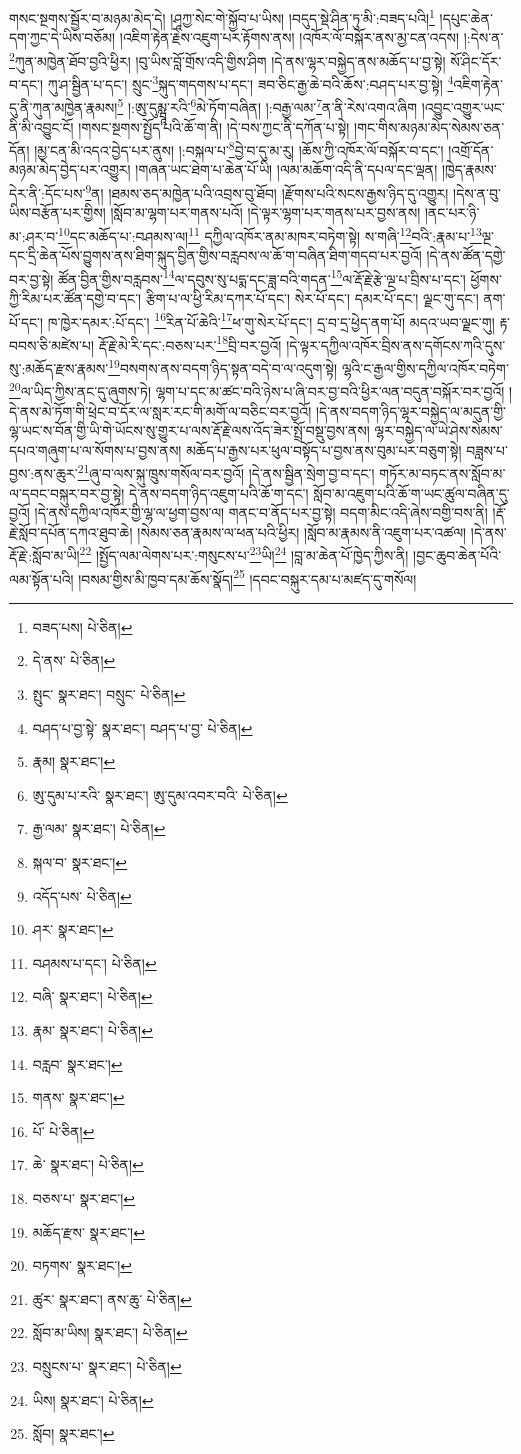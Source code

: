 གསང་སྔགས་སྦྱོར་བ་མཉམ་མེད་དེ། །ཤཱཀྱ་སེང་གེ་སྐྱོབ་པ་ཡིས། །བདུད་སྡེ་ཤིན་ཏུ་མི་:བཟད་པའི།\footnote{བཟད་པས།  པེ་ཅིན། } །དཔུང་ཆེན་དག་ཀྱང་དེ་ཡིས་བཅོམ། །འཇིག་རྟེན་རྗེས་འཇུག་པར་རྟོགས་ནས། །འཁོར་ལོ་བསྐོར་ནས་མྱ་ངན་འདས། །:དེས་ན་\footnote{དེ་ནས་  པེ་ཅིན། }ཀུན་མཁྱེན་ཐོབ་བྱའི་ཕྱིར། །བུ་ཡིས་བློ་གྲོས་འདི་གྱིས་ཤིག །དེ་ནས་ལྷར་བསྐྱེད་ནས་མཆོད་པ་བྱ་སྟེ། སོ་ཤིང་དོར་བ་དང་། ཀུ་ཤ་སྦྱིན་པ་དང་། སྲུང་\footnote{སྤུང་  སྣར་ཐང་། བསྲུང་  པེ་ཅིན། }སྐུད་གདགས་པ་དང་། ཟབ་ཅིང་རྒྱ་ཆེ་བའི་ཆོས་:བཤད་པར་བྱ་སྟེ། \footnote{བཤད་པ་བྱ་སྟེ་  སྣར་ཐང་། བཤད་པ་བྱ་  པེ་ཅིན། }འཇིག་རྟེན་དུ་ནི་ཀུན་མཁྱེན་རྣམས།\footnote{རྣམ།  སྣར་ཐང་། } །:ཨུ་དུམྺཱ་རའི་\footnote{ཨུ་དུམ་པ་རའི་  སྣར་ཐང་། ཨུ་དུམ་འབར་བའི་  པེ་ཅིན། }མེ་ཏོག་བཞིན། །:བརྒྱ་ལམ་\footnote{རྒྱ་ལམ་  སྣར་ཐང་།  པེ་ཅིན། }ན་ནི་རེས་འགའ་ཞིག །འབྱུང་འགྱུར་ཡང་ནི་མི་འབྱུང་ངོ། །གསང་སྔགས་སྤྱོད་པའི་ཆོ་ག་ནི། །དེ་བས་ཀྱང་ནི་དཀོན་པ་སྟེ། །གང་གིས་མཉམ་མེད་སེམས་ཅན་དོན། །མྱ་ངན་མི་འདའ་བྱེད་པར་ནུས། །:བསྐལ་པ་\footnote{སྐལ་བ་  སྣར་ཐང་། }བྱེ་བ་དུ་མ་རུ། །ཆོས་ཀྱི་འཁོར་ལོ་བསྐོར་བ་དང་། །འགྲོ་དོན་མཉམ་མེད་བྱེད་པར་འགྱུར། །གཞན་ཡང་ཐེག་པ་ཆེན་པོ་ཡི། །ལམ་མཆོག་འདི་ནི་དཔལ་དང་ལྡན། །ཁྱེད་རྣམས་དེར་ནི་:དོང་པས་\footnote{འདོད་པས་  པེ་ཅིན། }ན། །ཐམས་ཅད་མཁྱེན་པའི་འབྲས་བུ་ཐོབ། །རྫོགས་པའི་སངས་རྒྱས་ཉིད་དུ་འགྱུར། །དེས་ན་བུ་ཡིས་བརྩོན་པར་གྱིས། །སློབ་མ་ལྷག་པར་གནས་པའོ། །དེ་ལྟར་ལྷག་པར་གནས་པར་བྱས་ནས། །ནང་པར་ཉི་མ་:ཤར་བ་\footnote{ཤར་  སྣར་ཐང་། }དང་མཆོད་པ་:བཤམས་ལ།\footnote{བཤམས་པ་དང་།  པེ་ཅིན། } དཀྱིལ་འཁོར་ནམ་མཁར་བཏེག་སྟེ། ས་གཞི་\footnote{བཞི་  སྣར་ཐང་།  པེ་ཅིན། }བའི་:རྣམ་པ་\footnote{རྣམ་  སྣར་ཐང་།  པེ་ཅིན། }ལྔ་དང་དྲི་ཆེན་པོས་བྱུགས་ནས་ཐིག་སྐུད་བྱིན་གྱིས་བརླབས་ལ་ཆོ་ག་བཞིན་ཐིག་གདབ་པར་བྱའོ། །དེ་ནས་ཚོན་དགྱེ་བར་བྱ་སྟེ། ཚོན་བྱིན་གྱིས་བརླབས་\footnote{བརླབ་  སྣར་ཐང་། }ལ་དབུས་སུ་པདྨ་དང་ཟླ་བའི་གདན་\footnote{གནས་  སྣར་ཐང་། }ལ་རྡོ་རྗེ་རྩེ་ལྔ་པ་བྲིས་པ་དང་། ཕྱོགས་ཀྱི་རིམ་པར་ཚོན་དགྱེ་བ་དང་། རྩིག་པ་ལ་ཕྱི་རིམ་དཀར་པོ་དང་། སེར་པོ་དང་། དམར་པོ་དང་། ལྗང་གུ་དང་། ནག་པོ་དང་། ཁ་ཁྱེར་དམར་:པོ་དང་། \footnote{པོ་  པེ་ཅིན། }རིན་པོ་ཆེའི་\footnote{ཆེ་  སྣར་ཐང་།  པེ་ཅིན། }ཕ་གུ་སེར་པོ་དང་། དྲ་བ་དྲ་ཕྱེད་ནག་པོ། མདའ་ཡབ་ལྗང་གུ། རྟ་བབས་ཅི་མཛེས་པ། རྡོ་རྗེ་མེ་རི་དང་:བཅས་པར་\footnote{བཅས་པ་  སྣར་ཐང་། }བྲི་བར་བྱའོ། །དེ་ལྟར་དཀྱིལ་འཁོར་བྲིས་ནས་དགོངས་ཀའི་དུས་སུ་:མཆོད་རྫས་རྣམས་\footnote{མཆོད་རྫས་  སྣར་ཐང་། }བསགས་ནས་བདག་ཉིད་སྟན་བདེ་བ་ལ་འདུག་སྟེ། ལྷའི་ང་རྒྱལ་གྱིས་དཀྱིལ་འཁོར་བཏེག་\footnote{བཏགས་  སྣར་ཐང་། }ལ་ཡིད་ཀྱིས་ནང་དུ་ཞུགས་ཏེ། ལྷག་པ་དང་མ་ཚང་བའི་ཉེས་པ་ཞི་བར་བྱ་བའི་ཕྱིར་ལན་བདུན་བསྐོར་བར་བྱའོ། །དེ་ནས་མེ་ཏོག་གི་ཕྲེང་བ་དོར་ལ་སླར་རང་གི་མགོ་ལ་བཅིང་བར་བྱའོ། །དེ་ནས་བདག་ཉིད་ལྷར་བསྐྱེད་ལ་མདུན་གྱི་ལྷ་ཡང་ས་བོན་གྱི་ཡི་གེ་ཡོངས་སུ་གྱུར་པ་ལས་རྡོ་རྗེ་ལས་འོད་ཟེར་སྤྲོ་བསྡུ་བྱས་ནས། ལྷར་བསྐྱེད་ལ་ཡེ་ཤེས་སེམས་དཔའ་གཞུག་པ་ལ་སོགས་པ་བྱས་ནས། མཆོད་པ་རྒྱས་པར་ཕུལ་བསྟོད་པ་བྱས་ནས་བུམ་པར་བཅུག་སྟེ། བཟླས་པ་བྱས་:ནས་ཆུར་\footnote{ཚུར་  སྣར་ཐང་། ནས་ཆུ་  པེ་ཅིན། }ཞུ་བ་ལས་སྐུ་ཁྲུས་གསོལ་བར་བྱའོ། །དེ་ནས་སྦྱིན་སྲེག་བྱ་བ་དང་། གཏོར་མ་བཏང་ནས་སློབ་མ་ལ་དབང་བསྐུར་བར་བྱ་སྟེ། དེ་ནས་བདག་ཉིད་འཇུག་པའི་ཆོ་ག་དང་། སློབ་མ་འཇུག་པའི་ཆོ་ག་ཡང་ཚུལ་བཞིན་དུ་བྱའོ། །དེ་ནས་དཀྱིལ་འཁོར་གྱི་ལྷ་ལ་ཕྱག་བྱས་ལ། གནང་བ་ནོད་པར་བྱ་སྟེ། བདག་མིང་འདི་ཞེས་བགྱི་བས་ནི། །རྡོ་རྗེ་སློབ་དཔོན་དཀའ་ཐུབ་ཆེ། །སེམས་ཅན་རྣམས་ལ་ཕན་པའི་ཕྱིར། །སློབ་མ་རྣམས་ནི་འཇུག་པར་འཚལ། །དེ་ནས་རྡོ་རྗེ་:སློབ་མ་ཡི།\footnote{སློབ་མ་ཡིས།  སྣར་ཐང་།  པེ་ཅིན། } །སྤྱོད་ལམ་ལེགས་པར་:གསུངས་པ་\footnote{བསྲུངས་པ་  སྣར་ཐང་།  པེ་ཅིན། }ཡི།\footnote{ཡིས།  སྣར་ཐང་།  པེ་ཅིན། } །བླ་མ་ཆེན་པོ་ཁྱེད་ཀྱིས་ནི། །བྱང་ཆུབ་ཆེན་པོའི་ལམ་སྟོན་པའི། །བསམ་གྱིས་མི་ཁྱབ་དམ་ཆོས་སྣོད།\footnote{སློབ།  སྣར་ཐང་། } །དབང་བསྐུར་དམ་པ་མཛད་དུ་གསོལ། 